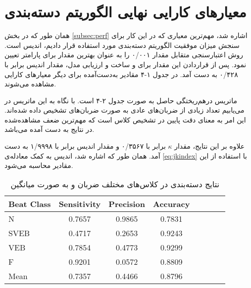 \section{معیارهای کارایی نهایی الگوریتم دسته‌بندی}
همان طور که در بخش \ref{subsec:perf} اشاره شد، مهم‌ترین معیاری که در این کار برای سنجش میزان موفقیت الگوریتم دسته‌بندی مورد استفاده قرار دادیم، اندیس  است. روش اعتبارسنجی متقابل مقدار  ۰/۰۰۱ را به عنوان بهترین مقدار برای پارامتر  تعیین نمود. پس از قراردادن این مقدار برای  و ساخت و ارزیابی مدل، مقدار اندیس  برابر با ۰/۴۲۸ به دست آمد. در جدول ۱-۴ مقادیر به‌دست‌آمده برای دیگر معیارهای کارایی مشاهده می‌شوند. 

 ماتریس درهم‌ریختگی حاصل به صورت جدول ۲-۴ است. با نگاه به این ماتریس در می‌یابیم تعداد زیادی از ضربان‌های عادی به صورت ضربان‌های 
 تشخیص داده شده‌اند. این امر به معنای دقت پایین در تشخیص کلاس  است که مهم‌ترین ضعف مشاهده‌شده در نتایج به دست آمده می‌باشد.



علاوه بر این نتایج، مقدار $\kappa$ برابر با ۰/۳۵۶۷ و مقدار اندیس  برابر با ۱/۹۹۹۸ به دست آمد. همان طور که اشاره شد، اندیس   به کمک معادله‌ی \ref{eq:jkindex} با استفاده از این مقادیر محاسبه می‌شود.


\begin{table}
\begin{center}
\begin{latin} 
\begin{tabular}{l*{6}{c}r}
Beat Class              & Sensitivity & Precision & Accuracy  \\
\hline
N & 0.7657 & 0.9865 & 0.7831  \\
SVEB            & 0.4717 & 0.2653 & 0.9243  \\
VEB           & 0.7854 & 0.4773 & 0.9299  \\
F    & 0.9201 & 0.0572 & 0.8809  \\
Mean    & 0.7357 & 0.4466 & 0.8796  \\
\end{tabular}
\end{latin}
\caption{نتایج دسته‌بندی در کلاس‌های مختلف ضربان و به صورت میانگین}
\end{center}
\label{table:results}
\end{table}

